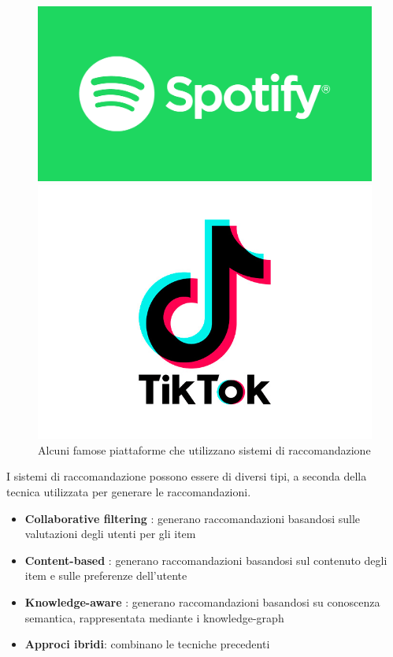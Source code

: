 \begin{figure}[h!]
\begin{minipage}{0.2\textwidth}
        \centering
        \includegraphics[width=\textwidth]{images/spotify.png}
    \end{minipage}\hfill
    \begin{minipage}{0.2\textwidth}
        \centering
        \includegraphics[width=\textwidth]{images/tiktok.png}
    \end{minipage}
    \caption{Alcuni famose piattaforme che utilizzano sistemi di raccomandazione}
\end{figure}


\noindent I sistemi di raccomandazione possono essere di diversi tipi, a seconda della tecnica utilizzata per generare le raccomandazioni.
\begin{itemize}
    \item \textbf{Collaborative filtering} \cite{CFRS}: generano raccomandazioni basandosi sulle valutazioni degli utenti per gli item
    \item \textbf{Content-based} \cite{Lops2011}: generano raccomandazioni basandosi sul contenuto degli item e sulle preferenze dell'utente
    \item \textbf{Knowledge-aware} \cite{KnowledgeBased}: generano raccomandazioni basandosi su conoscenza semantica, rappresentata mediante i knowledge-graph
    \item \textbf{Approci ibridi}: combinano le tecniche precedenti
\end{itemize}



